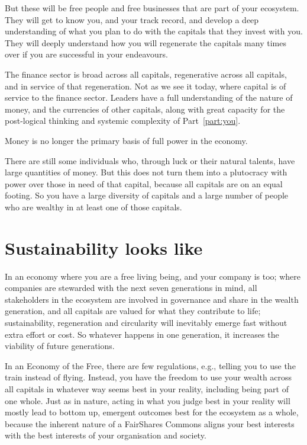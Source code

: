 But these will be free people and free businesses that are part of your ecosystem. They will get to know you, and your track record, and develop a deep understanding of what you plan to do with the capitals that they invest with you. They will deeply understand how you will regenerate the capitals many times over if you are successful in your endeavours.


The finance  sector is broad across all capitals, regenerative across all capitals, and in service of that regeneration. Not as we see it today, where capital is of service to the finance sector. Leaders have a full understanding of the nature of money, and the currencies of other capitals, along with great capacity for the post-logical thinking and systemic complexity\cite{henderson-hourglass} of Part~\ref{part:you}.


Money  is no longer the primary basis of full power  in the economy. 


There are still some individuals who, through luck or their natural talents, have large quantities of money. But this does not turn them into a plutocracy with power over those in need of that capital, because all capitals are on an equal footing. So you have a large diversity of capitals and a large number of people who are wealthy in at least one of those capitals.
\section{Sustainability looks like}
In an economy where you are a free living being, and your company is too; where  companies are stewarded with the next seven generations in mind, all stakeholders in the ecosystem are involved in governance and share in the wealth generation, and all capitals are valued for what they contribute to life; sustainability, regeneration and circularity will inevitably emerge fast without extra effort or cost. So whatever happens in one generation, it increases the viability of future generations. 


In an Economy of the Free, there are few regulations, e.g., telling you to use the train instead of flying. Instead, you have the freedom to use your wealth across all capitals in whatever way seems best in your reality, including being part of one whole. Just as in nature, acting in what you judge best in your reality will mostly lead to bottom up, emergent outcomes best for the ecosystem as a whole, because the inherent nature of a FairShares Commons  aligns your best interests with the best interests of your organisation and society. 


